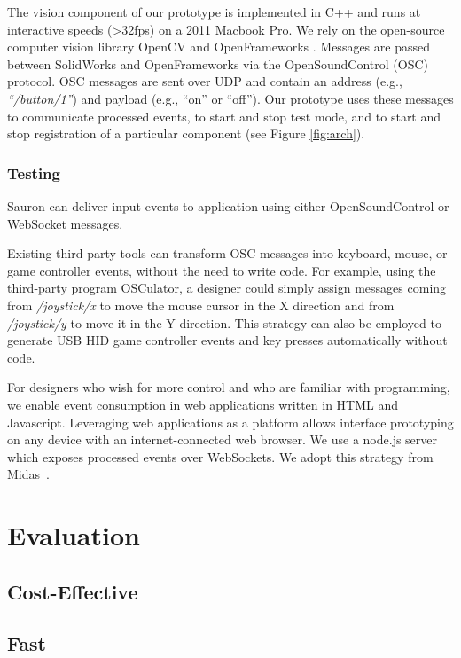 The vision component of our prototype is implemented in C++ and runs at interactive speeds (\textgreater 32fps) on a 2011 Macbook Pro.  We rely on the open-source computer vision library OpenCV \cite{opencv} and OpenFrameworks \cite{openframeworks}.
Messages are passed between SolidWorks and OpenFrameworks via the OpenSoundControl (OSC) protocol.  OSC messages are sent over UDP and contain an address (e.g., {\em ``/button/1''}) and payload (e.g., ``on'' or ``off'').  Our prototype uses these messages to communicate processed events, to start and stop test mode, and to start and stop registration of a particular component (see Figure \ref{fig:arch}).


\subsubsection{Testing}
Sauron can deliver input events to application using either OpenSoundControl or WebSocket messages.

Existing third-party tools can transform OSC messages into keyboard, mouse, or game controller events, without the need to write code. For example, using the third-party program OSCulator, a designer could simply assign messages coming from {\em /joystick/x} to move the mouse cursor in the X direction and from {\em /joystick/y} to move it in the Y direction.  This strategy can also be employed to generate USB HID game controller events and key presses automatically without code.

For designers who wish for more control and who are familiar with programming, we enable event consumption in web applications written in HTML and Javascript. Leveraging web applications as a platform allows interface prototyping on any device with an internet-connected web browser. 
We use a node.js server which exposes processed events over WebSockets.  We adopt this strategy from Midas~\cite{savage-midas}. 

\section{Evaluation}

    \subsection{Cost-Effective}
    
    \subsection{Fast}
    
